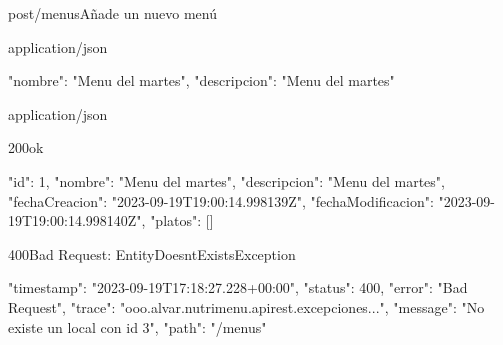 \begin{apiRoute}{post}{/menus}{Añade un nuevo menú}
	\begin{routeParameter}
	\end{routeParameter}
	\begin{routeRequest}{application/json}
		\begin{routeRequestBody}
{
	"nombre": "Menu del martes",
	"descripcion": "Menu del martes"
}
		\end{routeRequestBody}
	\end{routeRequest}
	\begin{routeResponse}{application/json}
		\begin{routeResponseItem}{200}{ok}
			\begin{routeResponseItemBody}
{
	"id": 1,
	"nombre": "Menu del martes",
	"descripcion": "Menu del martes",
	"fechaCreacion": "2023-09-19T19:00:14.998139Z",
	"fechaModificacion": "2023-09-19T19:00:14.998140Z",
	"platos": []
}
			\end{routeResponseItemBody}
		\end{routeResponseItem}
		\begin{routeResponseItem}{400}{Bad Request: EntityDoesntExistsException}
			\begin{routeResponseItemBody}
{
    "timestamp": "2023-09-19T17:18:27.228+00:00",
    "status": 400,
    "error": "Bad Request",
    "trace": "ooo.alvar.nutrimenu.apirest.excepciones...",
    "message": "No existe un local con id 3",
    "path": "/menus"
}
			\end{routeResponseItemBody}
		\end{routeResponseItem}
	\end{routeResponse}
\end{apiRoute}

